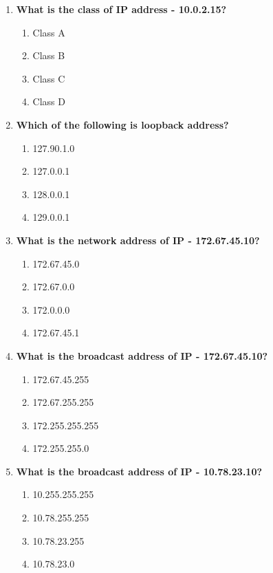 \begin{flushleft}
\begin{enumerate}
		\item \textbf{What is the class of IP address - 10.0.2.15?}
		\begin{enumerate}[label=(\alph*)]
			\item Class A  %
			\item Class B  
			\item Class C  
			\item Class D
		\end{enumerate}
		\bigskip
		\bigskip

		\item \textbf{Which of the following is loopback address?}
		\begin{enumerate}[label=(\alph*)]
			\item 127.90.1.0
			\item 127.0.0.1   %
			\item 128.0.0.1
			\item 129.0.0.1
		\end{enumerate}
		\bigskip
		\bigskip
		
		
		\item \textbf{What is the network address of IP - 172.67.45.10?}
		\begin{enumerate}[label=(\alph*)]
			\item 172.67.45.0
			\item 172.67.0.0 %
			\item 172.0.0.0
			\item 172.67.45.1
		\end{enumerate}
		\bigskip
		\bigskip

		\item \textbf{What is the broadcast address of IP - 172.67.45.10?}
		\begin{enumerate}[label=(\alph*)]
			\item 172.67.45.255
			\item 172.67.255.255 %
			\item 172.255.255.255
			\item 172.255.255.0
		\end{enumerate}
		\bigskip
		\bigskip		
		
		\item \textbf{What is the broadcast address of IP - 10.78.23.10?}
		\begin{enumerate}[label=(\alph*)]
			\item 10.255.255.255    %
			\item 10.78.255.255
			\item 10.78.23.255
			\item 10.78.23.0     
		\end{enumerate}
		\bigskip
		\bigskip		


\end{enumerate}
\end{flushleft}
